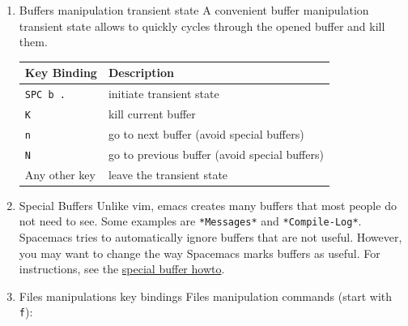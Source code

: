 \documentclass[11pt]{article}
\begin{document}
\begin{enumerate}
\item Buffers manipulation transient state
\label{sec:org215a50c}
A convenient buffer manipulation transient state allows to quickly cycles through
the opened buffer and kill them.

\begin{center}
\begin{tabular}{ll}
Key Binding & Description\\
\hline
\texttt{SPC b .} & initiate transient state\\
\texttt{K} & kill current buffer\\
\texttt{n} & go to next buffer (avoid special buffers)\\
\texttt{N} & go to previous buffer (avoid special buffers)\\
Any other key & leave the transient state\\
\end{tabular}
\end{center}

\item Special Buffers
\label{sec:org0c841a5}
Unlike vim, emacs creates many buffers that most people do not need to see. Some
examples are \texttt{*Messages*} and \texttt{*Compile-Log*}. Spacemacs tries to automatically
ignore buffers that are not useful. However, you may want to change the way
Spacemacs marks buffers as useful. For instructions, see the \href{FAQ.org}{special buffer howto}.

\item Files manipulations key bindings
\label{sec:org619aa6f}
Files manipulation commands (start with \texttt{f}):


\end{enumerate}
\end{document}
